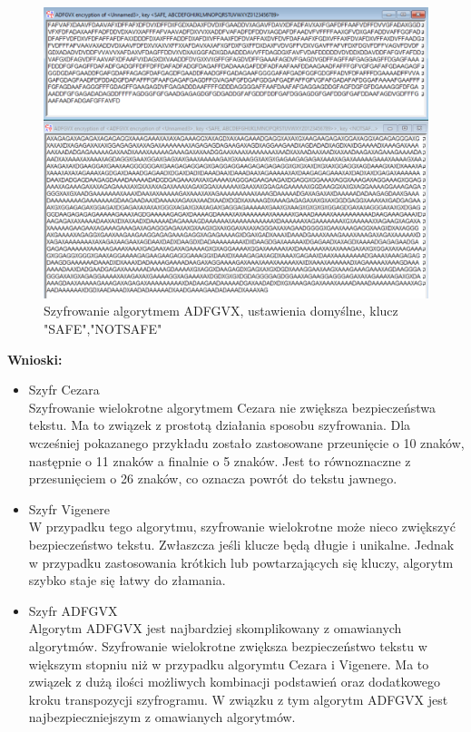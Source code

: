 \documentclass{article}
\begin{document}
\begin{figure}[H]
    \centering
    \includegraphics[width=\textwidth]{adfgvx_wielokrotne.png}
    \caption{Szyfrowanie algorytmem ADFGVX, ustawienia domyślne, klucz "SAFE","NOTSAFE"}
\end{figure}

\textbf{Wnioski:}
\begin{itemize}
    \item Szyfr Cezara \\
    Szyfrowanie wielokrotne algorytmem Cezara nie zwiększa bezpieczeństwa tekstu. Ma to związek z prostotą działania sposobu szyfrowania. Dla wcześniej pokazanego przykładu zostało zastosowane
    przeunięcie o 10 znaków, następnie o 11 znaków a finalnie o 5 znaków. Jest to równoznaczne z przesunięciem o 26 znaków, co oznacza powrót do tekstu jawnego.
    \item Szyfr Vigenere \\
    W przypadku tego algorytmu, szyfrowanie wielokrotne może nieco zwiększyć bezpieczeństwo tekstu. Zwłaszcza jeśli klucze będą długie i unikalne. Jednak w przypadku
    zastosowania krótkich lub powtarzających się kluczy, algorytm szybko staje się łatwy do złamania.
    \item Szyfr ADFGVX \\
    Algorytm ADFGVX jest najbardziej skomplikowany z omawianych algorytmów. Szyfrowanie wielokrotne zwiększa bezpieczeństwo tekstu w większym stopniu niż
    w przypadku algorymtu Cezara i Vigenere. Ma to związek z dużą ilości możliwych kombinacji podstawień oraz dodatkowego kroku transpozycji szyfrogramu.
    W związku z tym algorytm ADFGVX jest najbezpieczniejszym z omawianych algorytmów. 
\end{itemize}
\end{document}

